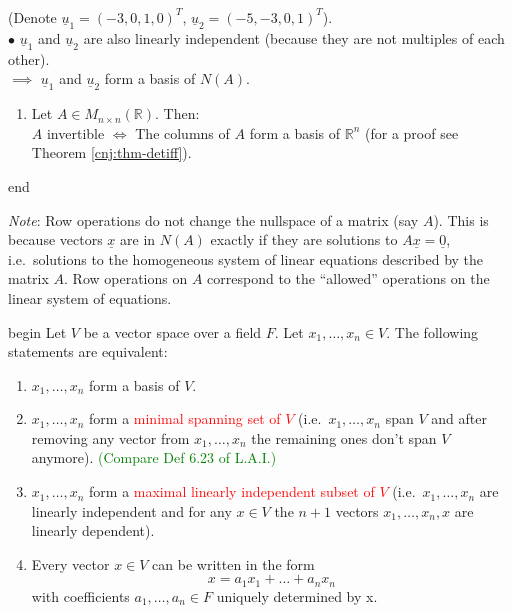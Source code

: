 \documentclass[
  12pt,
  a4paper,
  twoside]{article}
\providecommand{\tightlist}{%
  \setlength{\itemsep}{0pt}\setlength{\parskip}{0pt}}
\theoremstyle{plain}
\theoremstyle{definition}
\begin{document}
\begin{enumerate}
\begin{align*}
  \end{align*}
  (Denote \(\underline{u}_1=(-3,0,1,0)^T\), \(\underline{u}_2=(-5,-3,0,1)^T\)).\\
  \(\bullet\) \(\underline{u}_1\) and \(\underline{u}_2\) are also linearly independent (because they are not multiples of each other).\\
  \(\implies\) \(\underline{u}_1\) and \(\underline{u}_2\) form a basis of \(N(A)\).
\end{enumerate}

\begin{enumerate}
\def\labelenumi{(\alph{enumi})}
\setcounter{enumi}{4}
\tightlist
\item
  Let \(A \in M_{n \times n}(\mathbb{R})\). Then:\\
  \(A\) invertible \(\iff\) The columns of \(A\) form a basis of \(\mathbb{R}^n\) (for a proof see Theorem \ref{cnj:thm-detiff}).
\end{enumerate}

\csname end

\emph{Note}: Row operations do not change the nullspace of a matrix (say \(A\)).
This is because vectors \(\underline{x}\) are in \(N(A)\) exactly if they are solutions to \(A\underline{x}=\underline{0}\),
i.e.~solutions to the homogeneous system of linear equations described by the matrix \(A\).
Row operations on \(A\) correspond to the ``allowed'' operations on the linear system of equations.

\csname begin\label{cnj:prop-basisiff}
Let \(V\) be a vector space over a field \(F\).
Let \(x_1, \dots, x_n \in V\). The following statements are equivalent:

\begin{enumerate}
\def\labelenumi{(\alph{enumi})}
\tightlist
\item
  \(x_1, \dots, x_n\) form a basis of \(V\).
\item
  \(x_1, \dots, x_n\) form a \textcolor{red}{minimal spanning set of $V$} (i.e.~\(x_1, \dots, x_n\) span \(V\) and after removing any vector from \(x_1, \dots, x_n\) the remaining ones don't span \(V\) anymore). \textcolor{green}{(Compare Def 6.23 of L.A.I.)}
\item
  \(x_1, \dots, x_n\) form a \textcolor{red}{maximal linearly independent subset of $V$} (i.e.~\(x_1, \dots, x_n\) are linearly independent and for any \(x \in V\) the \(n+1\) vectors \(x_1, \dots, x_n,x\) are linearly dependent).
\item
  Every vector \(x \in V\) can be written in the form \[ x = a_1x_1 + \dots + a_nx_n \] with coefficients \(a_1, \dots, a_n \in F\) uniquely determined by x.
\end{enumerate}
\end{document}

